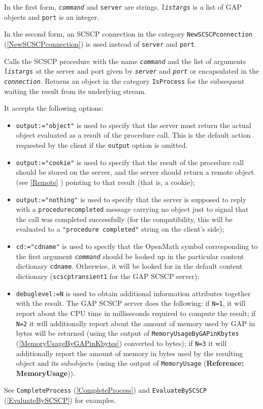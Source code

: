 \documentclass[a4paper,11pt]{report}
\begin{document}
{{{ In the first form, \mbox{\texttt{\mdseries\slshape command}} and \texttt{server} are strings, \mbox{\texttt{\mdseries\slshape listargs}} is a list of \textsf{GAP} objects and \texttt{port} is an integer. 

 In the second form, an \textsf{SCSCP} connection in the category \texttt{NewSCSCPconnection} (\ref{NewSCSCPconnection}) is used instead of \texttt{server} and \texttt{port}. 

 Calls the \textsf{SCSCP} procedure with the name \mbox{\texttt{\mdseries\slshape command}} and the list of arguments \mbox{\texttt{\mdseries\slshape listargs}} at the server and port given by \mbox{\texttt{\mdseries\slshape server}} and \mbox{\texttt{\mdseries\slshape port}} or encapsulated in the \mbox{\texttt{\mdseries\slshape connection}}. Returns an object in the category \texttt{IsProcess} for the subsequent waiting the result from its underlying stream. 

 It accepts the following options: 
\begin{itemize}
\item  \texttt{output:="object"} is used to specify that the server must return the actual object evaluated as
a result of the procedure call. This is the default action requested by the
client if the \texttt{output} option is omitted. 
\item  \texttt{output:="cookie"} is used to specify that the result of the procedure call should be stored on
the server, and the server should return a remote object (see \ref{Remote} ) pointing to that result (that is, a cookie); 
\item  \texttt{output:="nothing"} is used to specify that the server is supposed to reply with a \texttt{procedure{\textunderscore}completed} message carrying no object just to signal that the call was completed
successfully (for the compatibility, this will be evaluated to a \texttt{"procedure completed"} string on the client's side); 
\item  \texttt{cd:="cdname"} is used to specify that the \textsf{OpenMath} symbol corresponding to the first argument \mbox{\texttt{\mdseries\slshape command}} should be looked up in the particular content dictionary \texttt{cdname}. Otherwise, it will be looked for in the default content dictionary (\texttt{scscp{\textunderscore}transient{\textunderscore}1} for the \textsf{GAP} \textsf{SCSCP} server); 
\item  \texttt{debuglevel:=N} is used to obtain additional information attributes together with the result.
The \textsf{GAP} \textsf{SCSCP} server does the following: if \texttt{N=1}, it will report about the CPU time in milliseconds required to compute the
result; if \texttt{N=2} it will additionally report about the amount of memory used by \textsf{GAP} in bytes will be returned (using the output of \texttt{MemoryUsageByGAPinKbytes} (\ref{MemoryUsageByGAPinKbytes}) converted to bytes); if \texttt{N=3} it will additionally report the amount of memory in bytes used by the
resulting object and its subobjects (using the output of \texttt{MemoryUsage} (\textbf{Reference: MemoryUsage})). 
\end{itemize}
 See \texttt{CompleteProcess} (\ref{CompleteProcess}) and \texttt{EvaluateBySCSCP} (\ref{EvaluateBySCSCP}) for examples. }

}}
\end{document}
